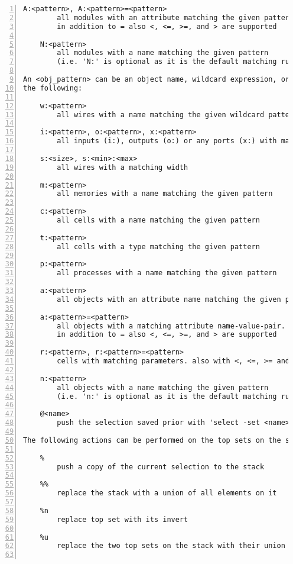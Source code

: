 \begin{lstlisting}[numbers=left,frame=single]
    A:<pattern>, A:<pattern>=<pattern>
        all modules with an attribute matching the given pattern
        in addition to = also <, <=, >=, and > are supported

    N:<pattern>
        all modules with a name matching the given pattern
        (i.e. 'N:' is optional as it is the default matching rule)

An <obj_pattern> can be an object name, wildcard expression, or one of
the following:

    w:<pattern>
        all wires with a name matching the given wildcard pattern

    i:<pattern>, o:<pattern>, x:<pattern>
        all inputs (i:), outputs (o:) or any ports (x:) with matching names

    s:<size>, s:<min>:<max>
        all wires with a matching width

    m:<pattern>
        all memories with a name matching the given pattern

    c:<pattern>
        all cells with a name matching the given pattern

    t:<pattern>
        all cells with a type matching the given pattern

    p:<pattern>
        all processes with a name matching the given pattern

    a:<pattern>
        all objects with an attribute name matching the given pattern

    a:<pattern>=<pattern>
        all objects with a matching attribute name-value-pair.
        in addition to = also <, <=, >=, and > are supported

    r:<pattern>, r:<pattern>=<pattern>
        cells with matching parameters. also with <, <=, >= and >.

    n:<pattern>
        all objects with a name matching the given pattern
        (i.e. 'n:' is optional as it is the default matching rule)

    @<name>
        push the selection saved prior with 'select -set <name> ...'

The following actions can be performed on the top sets on the stack:

    %
        push a copy of the current selection to the stack

    %%
        replace the stack with a union of all elements on it

    %n
        replace top set with its invert

    %u
        replace the two top sets on the stack with their union


\end{lstlisting}

